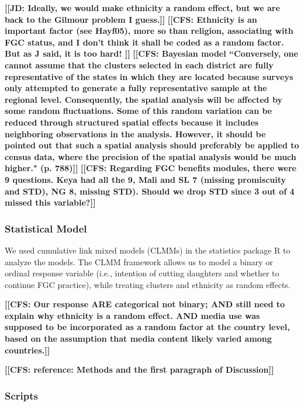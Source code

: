 \documentclass[12pt,]{article}
\newcommand{\comment}[1]{\textbf{[[#1]]}}
\newcommand{\cfcmt}[1]{\comment{CFS: #1}}
\newcommand{\jdcmt}[1]{\comment{JD: #1}}
\begin{document}
\jdcmt{Ideally, we would make ethnicity a random effect, but we are back to the Gilmour problem I guess.} \cfcmt{Ethnicity is an important factor (see Hayf05), more so than religion, associating with FGC status, and I don't think it shall be coded as a random factor.  But as J said, it is too hard! } %
\cfcmt{Bayesian model \cite{KandNwak09} ``Conversely, one cannot assume that the clusters selected in each district are fully representative of the states in which they are located because surveys only attempted to generate a fully representative sample at the regional level. Consequently, the spatial analysis will be affected by some random fluctuations.  Some of this random variation can be reduced through structured spatial effects because it includes neighboring observations in the analysis. However, it should be pointed out that such a spatial analysis should preferably be applied to census data, where the precision of the spatial analysis would be much higher." (p. 788)}
\cfcmt{Regarding FGC benefits modules, there were 9 questions.  Keya had all the 9, Mali and SL 7 (missing promiscuity and STD), NG 8, missing STD).  Should we drop STD since 3 out of 4 missed this variable?}

\subsubsection{Statistical Model}\label{statistical-model}

We used cumulative link mixed models (CLMMs) in the statistics package R \cite{Rstats,Rpackage_ordinal} to analyze the models.  The CLMM framework allows us to model a binary or ordinal response variable (i.e., intention of cutting daughters and whether to continue FGC practice), while treating clusters and ethnicity as random effects.

\cfcmt{Our response ARE categorical not binary; AND still need to explain why ethnicity is a random effect. AND media use was supposed to be incorporated as a random factor at the country level, based on the assumption that media content likely varied among countries.}

\cfcmt{reference: Methods and the first paragraph of Discussion\cite{Chia14}}


\subsubsection{Scripts}\label{scripts}
\end{document}
